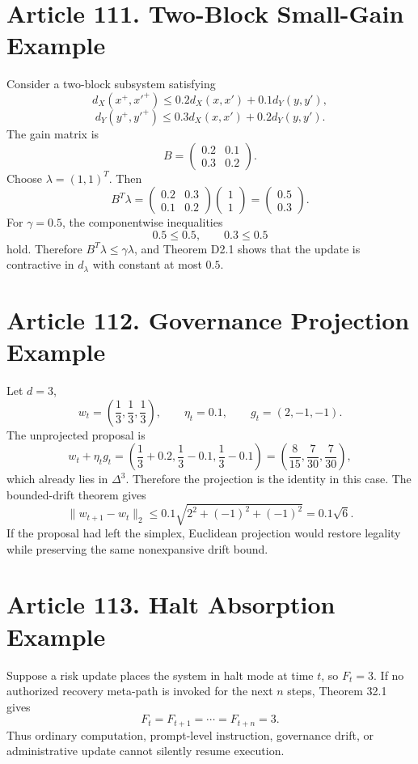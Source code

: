 \documentclass[10pt,oneside]{article}
\theoremstyle{definition}
\theoremstyle{remark}
\begin{document}
\section{Article 111. Two-Block Small-Gain Example}
Consider a two-block subsystem satisfying
\[
d_X(x^+,x'^+)\leq 0.2d_X(x,x')+0.1d_Y(y,y'),
\]
\[
d_Y(y^+,y'^+)\leq 0.3d_X(x,x')+0.2d_Y(y,y').
\]
The gain matrix is
\[
B=\begin{pmatrix}0.2&0.1\\0.3&0.2\end{pmatrix}.
\]
Choose \(\lambda=(1,1)^T\). Then
\[
B^T\lambda=\begin{pmatrix}0.2&0.3\\0.1&0.2\end{pmatrix}\begin{pmatrix}1\\1\end{pmatrix}=\begin{pmatrix}0.5\\0.3\end{pmatrix}.
\]
For \(\gamma=0.5\), the componentwise inequalities
\[
0.5\leq 0.5,
\qquad
0.3\leq 0.5
\]
hold. Therefore \(B^T\lambda\leq\gamma\lambda\), and Theorem D2.1 shows that the update is contractive in \(d_\lambda\) with constant at most \(0.5\).

\section{Article 112. Governance Projection Example}
Let \(d=3\),
\[
w_t=\left(\frac{1}{3},\frac{1}{3},\frac{1}{3}\right),
\qquad
\eta_t=0.1,
\qquad
g_t=(2,-1,-1).
\]
The unprojected proposal is
\[
w_t+\eta_tg_t=\left(\frac{1}{3}+0.2,\frac{1}{3}-0.1,\frac{1}{3}-0.1\right)=\left(\frac{8}{15},\frac{7}{30},\frac{7}{30}\right),
\]
which already lies in \(\Delta^3\). Therefore the projection is the identity in this case. The bounded-drift theorem gives
\[
\lVert w_{t+1}-w_t\rVert_2\leq 0.1\sqrt{2^2+(-1)^2+(-1)^2}=0.1\sqrt{6}.
\]
If the proposal had left the simplex, Euclidean projection would restore legality while preserving the same nonexpansive drift bound.

\section{Article 113. Halt Absorption Example}
Suppose a risk update places the system in halt mode at time \(t\), so \(F_t=3\). If no authorized recovery meta-path is invoked for the next \(n\) steps, Theorem 32.1 gives
\[
F_t=F_{t+1}=\cdots=F_{t+n}=3.
\]
Thus ordinary computation, prompt-level instruction, governance drift, or administrative update cannot silently resume execution.
\end{document}
